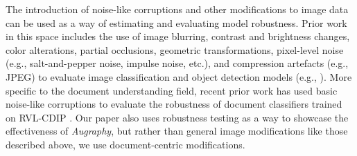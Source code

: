 \documentclass[runningheads]{llncs}
\begin{document}
The introduction of noise-like corruptions and other modifications to image data can be used as a way of estimating and evaluating model robustness.
Prior work in this space includes the use of image blurring, contrast and brightness changes, color alterations, partial occlusions, geometric transformations, pixel-level noise (e.g., salt-and-pepper noise, impulse noise, etc.), and compression artefacts (e.g., JPEG) to evaluate image classification and object detection models (e.g., \cite{image-quality-impact,imagenet-c,pathology-recommendations,Hosseini2017-kn-google-api,face-recognition-impact,pathology-schomig,Vasiljevic2016-al-bluring-impact}).
More specific to the document understanding field, recent prior work has used basic noise-like corruptions to evaluate the robustness of document classifiers trained on RVL-CDIP \cite{saifullah-2022}.
Our paper also uses robustness testing as a way to showcase the effectiveness of \emph{Augraphy}, but rather than general image modifications like those described above, we use document-centric modifications.
\end{document}
